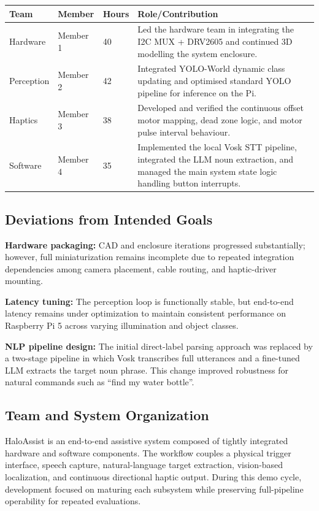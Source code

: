 \documentclass{article}
\begin{document}
\begin{table}[t]
\begin{tabular}{|p{}|p{}|p{}|p{}|}
\hline
\textbf{Team} & \textbf{Member} & \textbf{Hours} & \textbf{Role/Contribution} \\
\hline
Hardware & Member 1 & 40 & Led the hardware team in integrating the I2C MUX + DRV2605 and continued 3D modelling the system enclosure. \\
\hline
Perception & Member 2 & 42 & Integrated YOLO-World dynamic class updating and optimised standard YOLO pipeline for inference on the Pi. \\
\hline
Haptics & Member 3 & 38 & Developed and verified the continuous offset motor mapping, dead zone logic, and motor pulse interval behaviour. \\
\hline
Software & Member 4 & 35 & Implemented the local Vosk STT pipeline, integrated the LLM noun extraction, and managed the main system state logic handling button interrupts. \\
\hline
\end{tabular}
\end{table}

\subsection{Deviations from Intended Goals}

\textbf{Hardware packaging:} CAD and enclosure iterations progressed substantially; however, full miniaturization remains incomplete due to repeated integration dependencies among camera placement, cable routing, and haptic-driver mounting.

\textbf{Latency tuning:} The perception loop is functionally stable, but end-to-end latency remains under optimization to maintain consistent performance on Raspberry Pi 5 across varying illumination and object classes.

\textbf{NLP pipeline design:} The initial direct-label parsing approach was replaced by a two-stage pipeline in which Vosk transcribes full utterances and a fine-tuned LLM extracts the target noun phrase. This change improved robustness for natural commands such as ``find my water bottle''.

\subsection{Team and System Organization}

HaloAssist is an end-to-end assistive system composed of tightly integrated hardware and software components. The workflow couples a physical trigger interface, speech capture, natural-language target extraction, vision-based localization, and continuous directional haptic output. During this demo cycle, development focused on maturing each subsystem while preserving full-pipeline operability for repeated evaluations.
\end{document}

